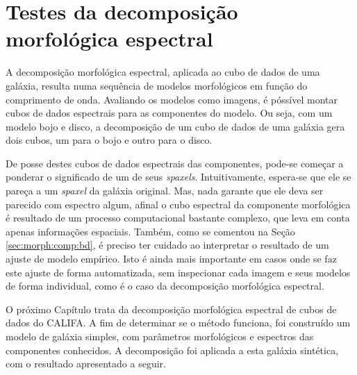 


\chapter{Testes da decomposição morfológica espectral}
\label{sec:test}

A decomposição morfológica espectral, aplicada ao cubo de dados de uma galáxia,
resulta numa sequência de modelos morfológicos em função do comprimento de onda.
Avaliando os modelos como imagens, é póssível montar cubos de dados espectrais
para as componentes do modelo. Ou seja, com um modelo bojo e disco, a
decomposição de um cubo de dados de uma galáxia gera dois cubos, um para o bojo
e outro para o disco.

De posse destes cubos de dados espectrais das componentes, pode-se começar a
ponderar o significado de um de seus {\em spaxels}. Intuitivamente, espera-se
que ele se pareça a um {\em spaxel} da galáxia original. Mas, nada garante que
ele deva ser parecido com espectro algum, afinal o cubo espectral da componente
morfológica é resultado de um processo computacional bastante complexo, que leva
em conta apenas informações espaciais. Também, como se comentou na Seção
\ref{sec:morph:comp:bd}, é preciso ter cuidado ao interpretar o resultado de um
ajuste de modelo empírico. Isto é ainda mais importante em casos onde se faz
este ajuste de forma automatizada, sem inspecionar cada imagem e seus modelos de
forma individual, como é o caso da decomposição morfológica espectral.

O próximo Capítulo trata da decomposição morfológica espectral de cubos de dados
do CALIFA. A fim de determinar se o método funciona, foi construído um modelo de
galáxia simples, com parâmetros morfológicos e espectros das componentes
conhecidos. A decomposição foi aplicada a esta galáxia sintética, com o
resultado apresentado a seguir.

